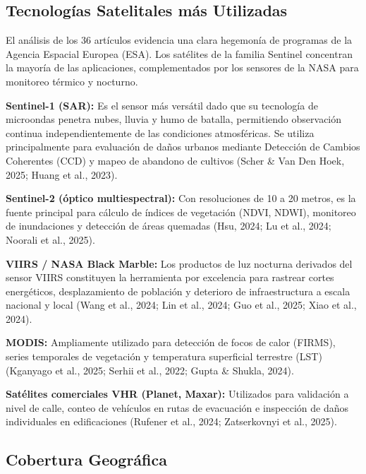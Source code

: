 \documentclass[12pt, a4paper]{article}
\begin{document}
\clearpage
\subsection{Tecnologías Satelitales más Utilizadas}

El análisis de los 36 artículos evidencia una clara hegemonía de programas de la Agencia Espacial Europea (ESA). Los satélites de la familia Sentinel concentran la mayoría de las aplicaciones, complementados por los sensores de la NASA para monitoreo térmico y nocturno.

\textbf{Sentinel-1 (SAR):} Es el sensor más versátil dado que su tecnología de microondas penetra nubes, lluvia y humo de batalla, permitiendo observación continua independientemente de las condiciones atmosféricas. Se utiliza principalmente para evaluación de daños urbanos mediante Detección de Cambios Coherentes (CCD) y mapeo de abandono de cultivos (Scher \& Van Den Hoek, 2025; Huang et al., 2023).

\textbf{Sentinel-2 (óptico multiespectral):} Con resoluciones de 10 a 20 metros, es la fuente principal para cálculo de índices de vegetación (NDVI, NDWI), monitoreo de inundaciones y detección de áreas quemadas (Hsu, 2024; Lu et al., 2024; Noorali et al., 2025).

\textbf{VIIRS / NASA Black Marble:} Los productos de luz nocturna derivados del sensor VIIRS constituyen la herramienta por excelencia para rastrear cortes energéticos, desplazamiento de población y deterioro de infraestructura a escala nacional y local (Wang et al., 2024; Lin et al., 2024; Guo et al., 2025; Xiao et al., 2024).

\textbf{MODIS:} Ampliamente utilizado para detección de focos de calor (FIRMS), series temporales de vegetación y temperatura superficial terrestre (LST) (Kganyago et al., 2025; Serhii et al., 2022; Gupta \& Shukla, 2024).

\textbf{Satélites comerciales VHR (Planet, Maxar):} Utilizados para validación a nivel de calle, conteo de vehículos en rutas de evacuación e inspección de daños individuales en edificaciones (Rufener et al., 2024; Zatserkovnyi et al., 2025).

\subsection{Cobertura Geográfica}
\end{document}
